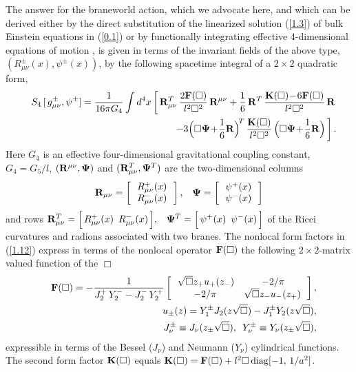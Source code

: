 \documentclass[a4paper,12pt]{article}
\begin{document}
The answer for the braneworld action, which we advocate
here, and which can be derived either by the direct substitution
of the linearized solution (\ref{1.3}) of bulk Einstein equations
in (\ref{0.1}) \cite{duality} or by functionally integrating
effective 4-dimensional equations of motion \cite{BWEA}, is
given in terms of the invariant fields of the above type,
$(R^\pm_{\mu\nu}(x),\psi^\pm(x))$, by the following spacetime
integral of a $2\times2$ quadratic form,
   \begin{eqnarray}
   &&S_4\,[\,g^\pm_{\mu\nu},\psi^\pm]
   =\frac1{16\pi G_4}\int d^4x \left[\,{\bf R}^T_{\mu\nu}\,
   \frac{2{\bf F}(\Box)}{l^2\Box^2}\,{\bf R}^{\mu\nu}
   +\frac16\,{\bf R}^{T}\,
   \frac{{\bf K}(\Box)\!-\!6{\bf F}(\Box)}{l^2\Box^2}
   \,{\bf R}\right.\nonumber\\
   &&\qquad\qquad\qquad\qquad\qquad
   \left.-3\Big(\Box{\bf\Psi}\!+\!\frac16{\bf R}\Big)^{\!T}\,
   \frac{{\bf K}(\Box)}{l^2\Box^2}\,
   \Big(\Box{\bf\Psi}\!+\!
   \frac16{\bf R}\Big)\,\right].      \label{1.12}
   \end{eqnarray}
Here $G_4$ is an effective four-dimensional gravitational coupling
constant,$ G_4=G_5/l$, $({\bf R}^{\mu\nu},{\bf\Psi})$ and $({\bf
R}^T_{\mu\nu},{\bf\Psi}^T)$ are the two-dimensional columns
  \begin{eqnarray}
   {\bf R}_{\mu\nu} =
   \left[\begin{array}{c}
      \,R_{\mu\nu}^+(x)\, \\ \,R_{\mu\nu}^-(x)\,
  \end{array}\right],\,\,\,\,\,
  {\bf\Psi}=\left[\begin{array}{c}
      \,\psi^+(x)\, \\ \, \psi^-(x)\,
  \end{array}\right]                       \label{1.13a}
   \end{eqnarray}
and rows ${\bf R}^T_{\mu\nu}=
   \Big[\,R^+_{\mu\nu}(x)\,\,\,
   R^-_{\mu\nu}(x)\,\Big],\,\,\,\,\,
   {\bf\Psi}^T=\Big[\,\psi^+(x)
   \,\,\,\psi^-(x)\,\Big]$
of the Ricci curvatures and radions associated with two branes. The nonlocal
form factors in (\ref{1.12}) express in terms of the nonlocal
operator ${\bf F}(\Box)$ the following $2\times2$-matrix valued
function of the $\Box$
    \begin{eqnarray}
    &&{\bf F}(\Box) =-\frac{1}{ J_2^+\,Y_2^- -J_2^-\,Y_2^+}
    \left[\begin{array}{cc}
    \,\sqrt{\Box} z_+u_+(z_-)&-2/\pi \\
    -2/\pi &\sqrt{\Box} z_-u_-(z_+)\,
    \end{array}\right],                            \label{4.11}\\
    &&u_\pm(z)=Y_1^\pm J_2(z\sqrt\Box)
    -J_1^\pm Y_2(z\sqrt\Box),                        \label{4.6}\\
    &&J_\nu^\pm\equiv J_\nu(z_\pm\sqrt\Box),\,\,\,
    Y_\nu^\pm\equiv Y_\nu(z_\pm\sqrt\Box),
    \end{eqnarray}
expressible in terms of the Bessel ($J_\nu$) and Neumann ($Y_\nu$)
cylindrical functions. The second form factor ${\bf K}(\Box)$
equals ${\bf K}(\Box)={\bf F}(\Box)+l^2\Box\,{\rm diag}[-1,\,1/a^2]$.
\end{document}
